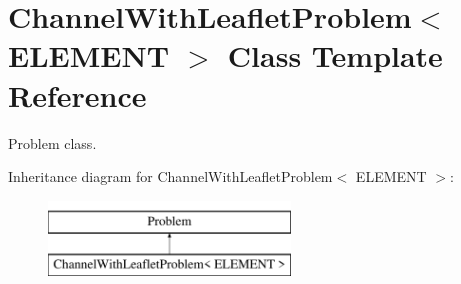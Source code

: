 \hypertarget{classChannelWithLeafletProblem}{}\section{Channel\+With\+Leaflet\+Problem$<$ E\+L\+E\+M\+E\+NT $>$ Class Template Reference}
\label{classChannelWithLeafletProblem}


Problem class.  


Inheritance diagram for Channel\+With\+Leaflet\+Problem$<$ E\+L\+E\+M\+E\+NT $>$\+:\begin{figure}[H]
\begin{center}
\leavevmode
\includegraphics[height=2.000000cm]{classChannelWithLeafletProblem}
\end{center}
\end{figure}
